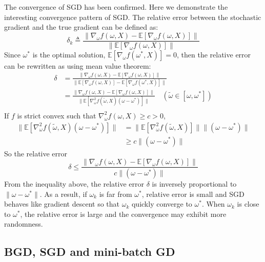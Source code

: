     The convergence of SGD has been confirmed. Here we demonstrate the interesting convergence pattern of SGD. The relative
    error between the stochastic gradient and the true gradient can be defined as:
    \begin{equation*}
      \delta_{k} \triangleq \frac{\|\nabla_{\omega}f(\omega,X) -
        \mathbb{E}[\nabla_{\omega}f(\omega,X)]\|}{\|\mathbb{E}[\nabla_{\omega}f(\omega,X)]\|}
    \end{equation*}
    Since $\omega^{*}$ is the optimal solution, $\mathbb{E}[\nabla_{\omega}f(\omega^{*},X)]=0$, then the relative error can
    be rewritten as using mean value theorem:
    \begin{align*}
      \delta & = \frac{\|\nabla_{\omega}f(\omega,X) - \mathbb{E}[\nabla_{\omega}f(\omega,X)]\|}{\|\mathbb{E}[\nabla_{\omega}f(\omega,X)]-\mathbb{E}[\nabla_{\omega}f(\omega^{*},X)]\|}                                    \\
             & = \frac{\|\nabla_{\omega}f(\omega,X) - \mathbb{E}[\nabla_{\omega}f(\omega,X)]\|}{\|\mathbb{E}[\nabla_{\omega}^{2}f(\tilde{\omega},X)(\omega-\omega^{*})]\|} \quad (\tilde{\omega} \in [\omega,\omega^{*}]) \\
    \end{align*}
    If $f$ is strict convex such that $\nabla_{\omega}^{2}f(\omega,X) \ge c >0$,
    \begin{align*}
      \|\mathbb{E}[\nabla_{\omega}^{2}f(\tilde{\omega},X)(\omega-\omega^{*})]\| & =
      \|\mathbb{E}[\nabla_{\omega}^{2}f(\tilde{\omega},X)]\|\|(\omega-\omega^{*})\| \\ & \ge c\|(\omega-\omega^{*})\|
    \end{align*}
    So the relative error
    \begin{equation*}
      \delta \le \frac{\|\nabla_{\omega}f(\omega,X) - \mathbb{E}[\nabla_{\omega}f(\omega,X)]\|}{c\|(\omega-\omega^{*})\|}
    \end{equation*}
    From the inequality above, the relative error $\delta$ is inversely proportional to $\|\omega-\omega^{*}\|$. As a
    result, if $\omega_{k}$ is far from $\omega^{*}$, relative error is small and SGD behaves like gradient descent so that
    $\omega_{k}$ quickly converge to $\omega^{*}$. When $\omega_{k}$ is close to $\omega^{*}$, the relative error is large
    and the convergence may exhibit more randomness.

  \subsection{BGD, SGD and mini-batch GD}

